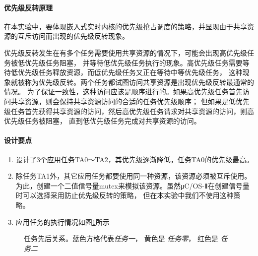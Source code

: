 \documentclass{ctexart}
\begin{document}
    \paragraph{优先级反转原理}
    
    在本实验中，要体现嵌入式实时内核的优先级抢占调度的策略，并显现由于共享资源的互斥访问而出现的优先级反转现象。
    
    优先级反转发生在有多个任务需要使用共享资源的情况下，可能会出现高优先级任务被低优先级任务阻塞，
    并等待低优先级任务执行的现象。高优先级任务需要等待低优先级任务释放资源，而低优先级任务又正在等待中等优先级任务，
    这种现象就被称为优先级反转。两个任务都试图访问共享资源是出现优先级反转最通常的情况。
    为了保证一致性，这种访问应该是顺序进行的。如果高优先级任务首先访问共享资源，则会保持共享资源访问的合适的任务优先级顺序；
    但如果是低优先级任务首先获得共享资源的访问，然后高优先级任务请求对共享资源的访问，则高优先级任务被阻塞，
    直到低优先级任务完成对共享资源的访问。
    
    \paragraph{设计要点}
    
    \begin{enumerate}
        \item 设计了3个应用任务TA0～TA2，其优先级逐渐降低，任务TA0的优先级最高。
        \item 除任务TA1外，其它应用任务都要使用同一种资源，该资源必须被互斥使用。
            为此，创建一个二值信号量mutex来模拟该资源。虽然μC/OS-Ⅱ在创建信号量时可以选择采用防止优先级反转的策略，
            但在本实验中我们不使用这种策略。
        \item 应用任务的执行情况如图\ref{fig:pt-1}所示
    \end{enumerate}
    \begin{figure}
        \centering
        \caption{任务先后关系。{\color{blue}蓝色}方格代表\textit{任务一}，
            {\color{yellow}黄色}是 \textit{任务零}，
            {\color{t2C}红色}是 \textit{任务二}}
        \label{fig:pt-1}
    \end{figure}
\end{document}
